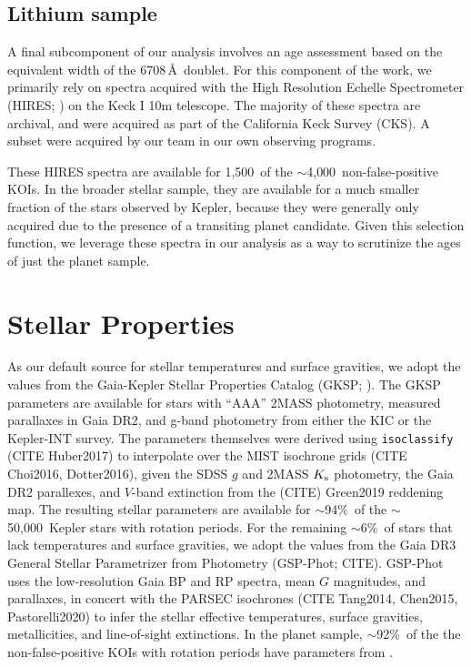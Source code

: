 \documentclass[11pt,twocolumn,tighten]{aastex63}
\newcommand{\nstarswithprot}{{$\sim$50{,}000}}
\newcommand{\fracstarswithprotwithbtwenty}{{$\sim$94\%}}
\newcommand{\fracstarswithprotwithoutbtwenty}{{$\sim$6\%}}
\newcommand{\nkoisnofp}{{$\sim$4{,}000}} %
\newcommand{\frackoisnofpwithprotwithbtwenty}{{$\sim$92\%}}
\newcommand{\nkoiswithhires}{{1{,}500}}
\begin{document}
\subsection{Lithium sample}
A final subcomponent of our analysis involves an age assessment based on
the equivalent width of the  6708\,\AA\ doublet.  For this
component of the work, we primarily rely on spectra acquired with the
High Resolution Echelle Spectrometer (HIRES;
\citealt{vogt_hires_1994}) on the Keck I 10m telescope.
The majority of these spectra are archival, and were acquired
as part of the California Keck Survey (CKS).
A subset were acquired by our team in our own observing programs.

These HIRES spectra are available for \nkoiswithhires\ of the
\nkoisnofp\ non-false-positive KOIs.
In the broader stellar sample, they are available for a much smaller 
fraction of the stars observed by Kepler, because they were generally only
acquired due to the presence of a transiting planet candidate.
Given this selection function,
we leverage these spectra in our analysis as a way to scrutinize the
ages of just the planet sample.



\section{Stellar Properties}


As our default source for stellar temperatures and surface gravities, we adopt
the values from the Gaia-Kepler Stellar Properties Catalog (GKSP;
\citealt{Berger_2020a_catalog}).
The GKSP parameters are available for stars with ``AAA'' 2MASS photometry,
measured parallaxes in Gaia DR2,  and g-band photometry from either the KIC or
the Kepler-INT survey.
The parameters themselves were derived using \texttt{isoclassify} (CITE
Huber2017) to interpolate over the MIST isochrone grids (CITE Choi2016,
Dotter2016), given the SDSS $g$ and 2MASS $K_{\rm s}$ photometry, the Gaia DR2
parallexes, and $V$-band extinction from the (CITE) Green2019 reddening map.
The resulting stellar parameters are available for
\fracstarswithprotwithbtwenty\ of the \nstarswithprot\ Kepler stars
with rotation periods.
For the remaining \fracstarswithprotwithoutbtwenty\ of stars that lack
temperatures and surface gravities, we adopt the values 
from the Gaia DR3 General Stellar Parametrizer from Photometry (GSP-Phot; CITE).
GSP-Phot uses the low-resolution Gaia BP and RP spectra, mean $G$ magnitudes,
and parallaxes, in concert with the PARSEC isochrones (CITE Tang2014, Chen2015,
Pastorelli2020) to infer the stellar effective temperatures, surface gravities,
metallicities, and line-of-sight extinctions.
In the planet sample,
\frackoisnofpwithprotwithbtwenty\ of the
the non-false-positive KOIs with rotation periods have parameters from
\citet{Berger_2020a_catalog}.
\end{document}
